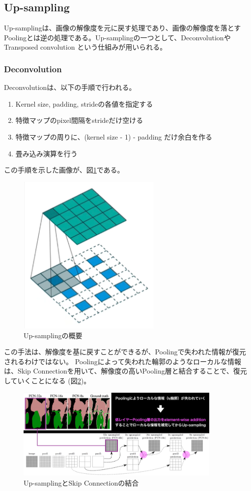 \documentclass{ltjsarticle}
\begin{document}
\subsection{Up-sampling}
Up-samplingは、画像の解像度を元に戻す処理であり、画像の解像度を落とすPoolingとは逆の処理である。Up-samplingの一つとして、DeconvolutionやTransposed convolution という仕組みが用いられる。

\subsubsection{Deconvolution}
Deconvolutionは、以下の手順で行われる。
\begin{enumerate}
  \item Kernel size, padding, strideの各値を指定する
  \item 特徴マップのpixel間隔をstrideだけ空ける
  \item 特徴マップの周りに、(kernel size - 1) - padding だけ余白を作る
  \item 畳み込み演算を行う
\end{enumerate}
この手順を示した画像が、図\ref{fig:Up-sampling}である。
\begin{figure}[htbp]
  \centering
  \includegraphics[width=7cm]{./capture/Up-sampling.png}
  \caption{Up-samplingの概要}
  \label{fig:Up-sampling}
\end{figure}
この手法は、解像度を基に戻すことができるが、Poolingで失われた情報が復元されるわけではない。
Poolingによって失われた輪郭のようなローカルな情報は、Skip Connectionを用いて、解像度の高いPooling層と結合することで、復元していくことになる (図\ref{Up-sampling_prediction})。
\begin{figure}[htbp]
  \centering
  \includegraphics[width=10cm]{./capture/Up-sampling_prediction.png}
  \caption{Up-samplingとSkip Connectionの結合}
  \label{Up-sampling_prediction}
\end{figure}
\end{document}

